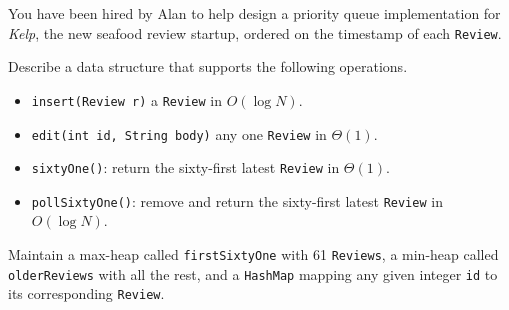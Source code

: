 \begin{blocksection}
\question You have been hired by Alan to help design a priority queue
implementation for \emph{Kelp}, the new seafood review startup, ordered on the
timestamp of each \lstinline$Review$.

Describe a data structure that supports the following operations.

\begin{itemize}
\item \lstinline$insert(Review r)$ a \lstinline$Review$ in $O(\log N)$.
\item \lstinline$edit(int id, String body)$ any one \lstinline$Review$ in
$\Theta(1)$.
\item \lstinline$sixtyOne()$: return the sixty-first latest \lstinline$Review$
in $\Theta(1)$.
\item \lstinline$pollSixtyOne()$: remove and return the sixty-first latest
\lstinline$Review$ in $O(\log N)$.
\end{itemize}

\begin{solution}[1.5in]
Maintain a max-heap called \lstinline$firstSixtyOne$ with 61
\lstinline$Reviews$, a min-heap called \lstinline$olderReviews$ with all the
rest, and a \lstinline$HashMap$ mapping any given integer \lstinline$id$ to its
corresponding \lstinline$Review$.
\end{solution}
\end{blocksection}
